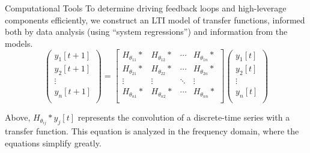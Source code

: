 \documentclass[final]{beamer}
\newlength{\onecolwid}
\newlength{\twocolwid}
\begin{document}
\begin{frame}[fragile]
\begin{columns}[t]
\begin{column}{\twocolwid}
\begin{columns}[t]
\begin{column}{\onecolwid}
\begin{alertblock}{Computational Tools}
        To determine driving feedback loops and high-leverage
        components efficiently, we construct an LTI model of transfer
        functions, informed both by data analysis (using ``system
        regressions'') and information from the models.
        \[
        \begin{pmatrix}
          y_1[t+1] \\
          y_2[t+1] \\
          \vdots \\
          y_n[t+1] \\
        \end{pmatrix}
        =
        \begin{bmatrix}
          H_{\theta_{11}}* & H_{\theta_{12}}* & \cdots &
          H_{\theta_{1n}}* \\
          H_{\theta_{21}}* & H_{\theta_{22}}* & \cdots &
          H_{\theta_{2n}}* \\
          \vdots & \vdots & \ddots & \vdots \\
          H_{\theta_{n1}}* & H_{\theta_{n2}}* & \cdots &
          H_{\theta_{nn}}* \\
        \end{bmatrix}
        \begin{pmatrix}
          y_1[t] \\
          y_2[t] \\
          \vdots \\
          y_n[t] \\
        \end{pmatrix}
        \]

        Above, $H_{\theta_{ij}} * y_j[t]$ represents the convolution
        of a discrete-time series with a transfer function.  This
        equation is analyzed in the frequency domain, where the equations
        simplify greatly.
        
      \end{alertblock}
 
    \end{column}

    \end{columns}


\end{column}
\end{columns}
\end{frame}
\end{document}
